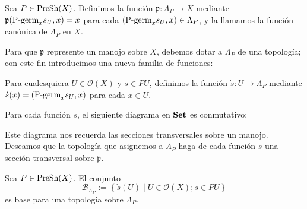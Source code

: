 \begin{Def}
   Sea $P\in\normalfont{\text{PreSh}}(X)$. Definimos la función $\mathfrak{p}:\Lambda_P\to X$ mediante $\mathfrak{p}(\normalfont{\text{P-germ}}_{x}s_{U},x)=x$ para cada $(\normalfont{\text{P-germ}}_{x}s_{U},x)\in\Lambda_P$, y la llamamos la función canónica de $\Lambda_P$ en $X$. 
\end{Def}
Para que $\mathfrak{p}$ represente un manojo sobre $X$, debemos dotar a $\Lambda_P$ de una topología; con este fin introducimos una nueva familia de funciones:
\begin{Def}
   Para cualesquiera $U\in\mathcal{O}(X)$ y $s\in PU$, definimos la función $\dot{s}:U\to\Lambda_P$ mediante $\dot{s}(x)=(\normalfont{\text{P-germ}}_{x}s_{U},x)$ para cada $x\in U$.
\end{Def}
Para cada función $\dot{s}$, el siguiente diagrama en $\normalfont{\textbf{Set}}$ es conmutativo:
   
Este diagrama nos recuerda las secciones transversales sobre un manojo. Deseamos que la topología que asignemos a $\Lambda_P$ haga de cada función $\dot{s}$ una sección transversal sobre $\mathfrak{p}$.
\begin{Prop}
   Sea $P\in\normalfont{\text{PreSh}}(X)$. El conjunto
   $$
      \mathcal{B}_{\Lambda_P}:=\left\lbrace \dot{s}(U)\mid U\in\mathcal{O}(X);s\in PU\right\rbrace
   $$
   es base para una topología sobre $\Lambda_P$.
\end{Prop}
